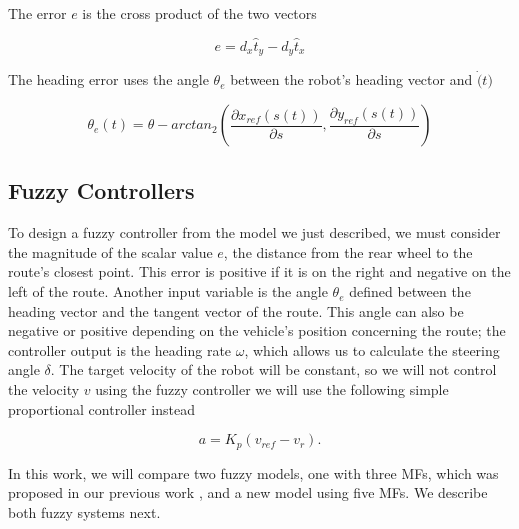 \documentclass[symmetry,article,submit,moreauthors,pdftex]{Definitions/mdpi}
\begin{document}
The error $e$ is the cross product of the two vectors

\begin{equation}
e = d_x \hat{t}_y - d_y \hat{t}_x
\end{equation}

The heading error uses the angle $\theta_e$ between the robot's heading vector
and $\dot(t)$

\begin{equation}
\theta_e(t) = \theta - arctan_2 \left( \frac{\partial x_{ref}(s(t))}{\partial s} , \frac{\partial y_{ref}(s(t))}{\partial s} \right)
\end{equation}





\subsection{Fuzzy Controllers}%
    \label{sub:FuzzyControllers}

To design a fuzzy controller from the model we just described, we must consider
the magnitude of the scalar value $e$, the distance from the rear wheel to the
route's closest point. This error is positive if it is on the right and
negative on the left of the route. Another input variable is the angle
$\theta_e$ defined between the heading vector and the tangent vector of the
route. This angle can also be negative or positive depending on the vehicle's
position concerning the route; the controller output is the heading rate
$\omega$, which allows us to calculate the steering angle $\delta$. The target
velocity of the robot will be constant, so we will not control the
velocity $v$ using the fuzzy controller we will use the following simple
proportional controller instead

\begin{equation}
    a = K_p(v_{ref}-v_r).
\end{equation}

In this work, we will compare two fuzzy models, one with three MFs, which was
proposed in our previous work \cite{Mancilla2021}, and a new model using five
MFs. We describe both fuzzy systems next.
\end{document}
